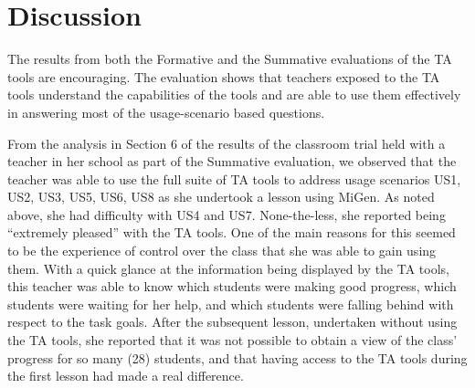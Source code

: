 \section{Discussion}
\label{sec:discussion}

The results from both the Formative and the Summative evaluations of
the TA tools are encouraging. The evaluation shows that teachers
exposed to the TA tools understand the capabilities of
the tools and are able to use them effectively in answering most
of the usage-scenario based questions. 
% 
%


From the analysis in Section 6 of the results of the classroom trial held with a
teacher in her school as part of the Summative evaluation,
we observed that the teacher was able to use the full suite of TA
tools to address usage scenarios US1, US2, US3, US5, US6, US8 as she undertook a
lesson using MiGen. As noted above, she had difficulty with US4 and US7.
None-the-less, she reported being ``extremely pleased'' with the TA tools. 
One of the main reasons for this seemed to be the experience of control over the class
that she was able to gain using them. With a quick glance at the information being
displayed by the TA tools, this teacher was able to know which students
were making good progress, which students were waiting for her help,
and which students were falling behind with respect to the task goals.
After the subsequent lesson, undertaken without using the TA tools,
she reported that it was not possible to obtain a view
of the class' progress for so many (28) students, 
and that having access to the TA tools during the first lesson 
had made a real difference. 

